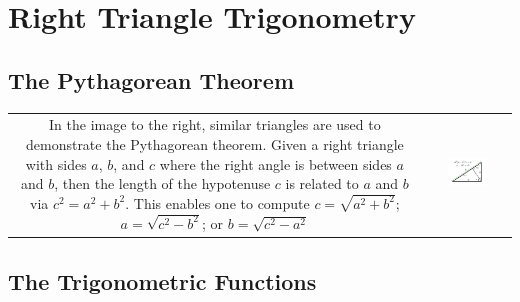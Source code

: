 \documentclass{article}
\begin{document}
\section{Right Triangle Trigonometry}

\subsection{The Pythagorean Theorem}

\begin{tabular}{cc}
\parbox{0.3\textwidth}{
In the image to the right, similar triangles are used to demonstrate the Pythagorean theorem. Given a right triangle with sides \(a\), \(b\), and \(c\) where the right angle is between sides \(a\) and \(b\), then the length of the hypotenuse \(c\) is related to \(a\) and \(b\) via \(c^2 = a^2 + b^2\). This enables one to compute \(c = \sqrt{a^2 + b^2}\); \(a = \sqrt{c^2 - b^2}\); or \(b = \sqrt{c^2 - a^2}\)
} & \parbox{0.5\textwidth}{
\includegraphics[width = 0.5\textwidth]{Pythagorean_Theorem}
}
\end{tabular}



\subsection{The Trigonometric Functions}
\end{document}
